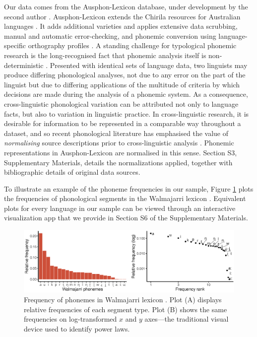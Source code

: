 Our data comes from the Ausphon-Lexicon database, under development by the second author \autocite{round_ausphon-lexicon_2017}. Ausphon-Lexicon extends the Chirila resources for Australian languages \autocite{bowern_chirila:_2016}. It adds additional varieties and applies extensive data scrubbing, manual and automatic error-checking, and phonemic conversion using language-specific orthography profiles \autocite{moran_unicode_2018}. A standing challenge for typological phonemic research is the long-recognised fact that phonemic analysis itself is non-deterministic \autocites{chao_non-uniqueness_1934}{hockett_problem_1963}{hyman_universals_2008}{dresher_contrastive_2009}. Presented with identical sets of language data, two linguists may produce differing phonological analyses, not due to any error on the part of the linguist but due to differing applications of the multitude of criteria by which decisions are made during the analysis of a phonemic system. As a consequence, cross-linguistic phonological variation can be attributed not only to language facts, but also to variation in linguistic practice. In cross-linguistic research, it is desirable for information to be represented in a comparable way throughout a dataset, and so recent phonological literature has emphasised the value of \emph{normalising} source descriptions prior to cross-linguistic analysis \autocites{lass_vowel_1984}{hyman_universals_2008}{van_der_hulst_phonological_2017}{round_matthew_2017}{kiparsky_formal_2018}. Phonemic representations in Ausphon-Lexicon are normalised in this sense. Section S3, Supplementary Materials, details the normalizations applied, together with bibliographic details of original data sources.

To illustrate an example of the phoneme frequencies in our sample, Figure \ref{fig:Figure-1} plots the frequencies of phonological segments in the Walmajarri lexicon \autocite{hudson_walmajarri_1993}. Equivalent plots for every language in our sample can be viewed through an interactive visualization app that we provide in Section S6 of the Supplementary Materials.

\begin{figure}

{\centering \includegraphics[width=180mm]{03-phoneme-frequencies/fig/Fig1_walmajarri} 

}

\caption[Frequency of phonemes in Walmajarri lexicon \autocite{hudson_walmajarri_1993}]{Frequency of phonemes in Walmajarri lexicon \autocite{hudson_walmajarri_1993}. Plot (A) displays relative frequencies of each segment type. Plot (B) shows the same frequencies on log-transformed \(x\) and \(y\) axes---the traditional visual device used to identify power laws.}\label{fig:Figure-1}
\end{figure}



